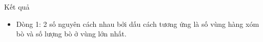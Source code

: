 Kết quả  
\begin{itemize}
	\item     Dòng 1: 2 số nguyên cách nhau bởi dấu cách tương ứng là số   vùng hàng xóm bò và số lượng bò ở vùng lớn nhất.   
\end{itemize}